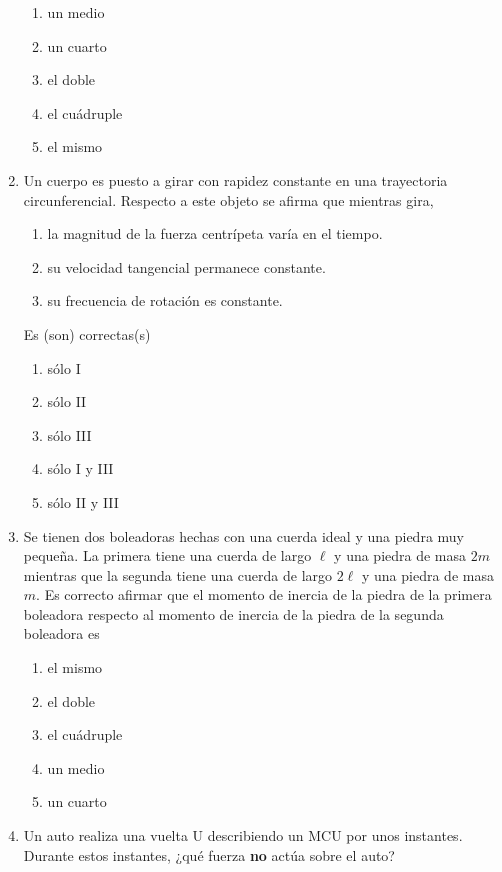 \documentclass[letterpaper]{article}
\begin{document}
\begin{enumerate}
\begin{enumerate}[label=\Alph*)]
\item un medio
\item un cuarto
\item el doble
\item el cuádruple
\item el mismo
\end{enumerate}

\item Un cuerpo es puesto a girar con rapidez constante en una trayectoria circunferencial. Respecto a este objeto se afirma que mientras gira,

\begin{enumerate}[label=\Roman*)]
\item la magnitud de la fuerza centrípeta varía en el tiempo.
\item su velocidad tangencial permanece constante.
\item su frecuencia de rotación es constante.
\end{enumerate}

Es (son) correctas(s)

\begin{enumerate}[label=\Alph*)]
\item sólo I
\item sólo II
\item sólo III
\item sólo I y III
\item sólo II y III
\end{enumerate}

\item Se tienen dos boleadoras hechas con una cuerda ideal y una piedra muy pequeña. La primera tiene una cuerda de largo $\ell$ y una piedra de masa $2m$ mientras que la segunda tiene una cuerda de largo $2\ell$ y una piedra de masa $m$. Es correcto afirmar que el momento de inercia de la piedra de la primera boleadora respecto al momento de inercia de la piedra de la segunda boleadora es 

\begin{enumerate}[label=\Alph*)]
\item el mismo
\item el doble
\item el cuádruple
\item un medio
\item un cuarto
\end{enumerate}

\item Un auto realiza una vuelta U describiendo un MCU por unos instantes. Durante estos instantes, ¿qué fuerza \textbf{no} actúa sobre el auto? 


\end{enumerate}
\end{document}
